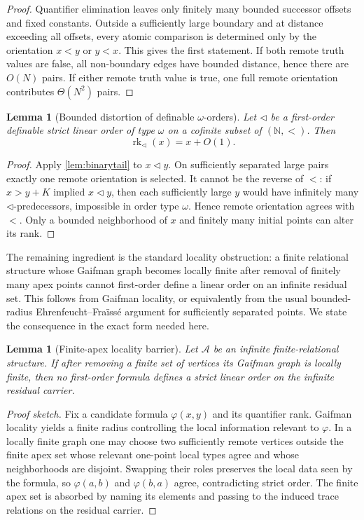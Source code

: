 \documentclass[11pt]{article}
\newtheorem{lemma}[theorem]{Lemma}
\theoremstyle{definition}
\newcommand{\N}{\mathbb N}
\newcommand{\rk}{\operatorname{rk}}
\begin{document}
\begin{proof}
Quantifier elimination leaves only finitely many bounded successor offsets and fixed constants.  Outside a sufficiently large boundary and at distance exceeding all offsets, every atomic comparison is determined only by the orientation $x<y$ or $y<x$.  This gives the first statement.  If both remote truth values are false, all non-boundary edges have bounded distance, hence there are $O(N)$ pairs.  If either remote truth value is true, one full remote orientation contributes $\Theta(N^2)$ pairs.
\end{proof}

\begin{lemma}[Bounded distortion of definable $\omega$-orders]\label{lem:distortion}
Let $\triangleleft$ be a first-order definable strict linear order of type $\omega$ on a cofinite subset of $(\N,<)$.  Then
\[
\rk_{\triangleleft}(x)=x+O(1).
\]
\end{lemma}

\begin{proof}
Apply \cref{lem:binarytail} to $x\triangleleft y$.  On sufficiently separated large pairs exactly one remote orientation is selected.  It cannot be the reverse of $<$: if $x>y+K$ implied $x\triangleleft y$, then each sufficiently large $y$ would have infinitely many $\triangleleft$-predecessors, impossible in order type $\omega$.  Hence remote orientation agrees with $<$.  Only a bounded neighborhood of $x$ and finitely many initial points can alter its rank.
\end{proof}

The remaining ingredient is the standard locality obstruction: a finite relational structure whose Gaifman graph becomes locally finite after removal of finitely many apex points cannot first-order define a linear order on an infinite residual set.  This follows from Gaifman locality, or equivalently from the usual bounded-radius Ehrenfeucht--Fra\"iss\'e argument for sufficiently separated points.  We state the consequence in the exact form needed here.

\begin{lemma}[Finite-apex locality barrier]\label{lem:locality}
Let $\mathcal A$ be an infinite finite-relational structure.  If after removing a finite set of vertices its Gaifman graph is locally finite, then no first-order formula defines a strict linear order on the infinite residual carrier.
\end{lemma}

\begin{proof}[Proof sketch]
Fix a candidate formula $\varphi(x,y)$ and its quantifier rank.  Gaifman locality yields a finite radius controlling the local information relevant to $\varphi$.  In a locally finite graph one may choose two sufficiently remote vertices outside the finite apex set whose relevant one-point local types agree and whose neighborhoods are disjoint.  Swapping their roles preserves the local data seen by the formula, so $\varphi(a,b)$ and $\varphi(b,a)$ agree, contradicting strict order.  The finite apex set is absorbed by naming its elements and passing to the induced trace relations on the residual carrier.
\end{proof}
\end{document}
